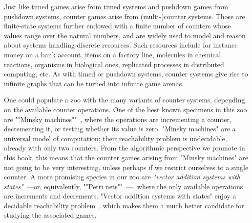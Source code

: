 Just like timed games arise from timed systems and pushdown games
from pushdown systems, counter games arise from (multi-)counter
systems.  Those are finite-state systems further endowed with a
finite number of counters whose values range over the natural numbers,
and are widely used to model and reason about systems handling
discrete resources.  Such resources include for instance money on a
bank account, items on a factory line, molecules in chemical
reactions, organisms in biological ones, replicated processes in
distributed computing, etc.  As with timed or pushdown systems,
counter systems give rise to infinite graphs that can be turned into
infinite game arenas.

\AP One could populate a zoo with the many variants of counter systems,
depending on the available counter operations.  One of the best known
specimens in this zoo are ""Minsky machines""~\cite{Minsky:1967},
where the operations are incrementing a counter, decrementing it, or
testing whether its value is zero.  "Minsky machines" are a universal
model of computation; their reachability problem is undecidable,
already with only two counters.  From the algorithmic perspective we
promote in this book, this means that the counter games arising from
"Minsky machines" are not going to be very interesting, unless perhaps
if we restrict ourselves to a single counter.  A more promising
species in our zoo are \emph{"vector addition systems with
  states"}~\cite{Greibach:1978,Hopcroft&Pansiot:1979}---or,
equivalently, ""Petri nets""~\cite{Petri:1962}---, where the only
available operations are increments and decrements.  "Vector addition
systems with states" enjoy a decidable reachability
problem~\cite{Mayr:1981,Kosaraju:1982,Lambert:1992,Leroux:2011}, which
makes them a much better candidate for studying the associated games.

